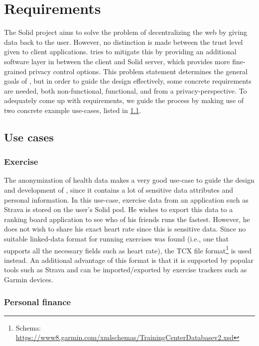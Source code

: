 \chapter{Requirements}
\label{cha:middleware}
The Solid project aims to solve the problem of decentralizing the web by giving data back to the user. However, no distinction is made between the trust level given to client applications. \middleware{} tries to mitigate this by providing an additional software layer in between the client and Solid server, which provides more fine-grained privacy control options. This problem statement determines the general goals of \middleware{}, but in order to guide the design effectively, some concrete requirements are needed, both non-functional, functional, and from a privacy-perspective. To adequately come up with requirements, we guide the process by making use of two concrete example use-cases, listed in \ref{sec:usecases}.   

\section{Use cases}
\label{sec:usecases}
\subsection{Exercise}
The anonymization of health data makes a very good use-case to guide the design and development of \middleware{}, since it contains a lot of sensitive data attributes and personal information. In this use-case, exercise data from an application such as Strava is stored on the user's Solid pod. He wishes to export this data to a ranking board application to see who of his friends runs the fastest. However, he does not wish to share his exact heart rate since this is sensitive data. Since no suitable linked-data format for running exercises was found (i.e., one that supports all the necessary fields such as heart rate), the \gls{TCX} file format\footnote{Schema: \url{https://www8.garmin.com/xmlschemas/TrainingCenterDatabasev2.xsd}} is used instead. An additional advantage of this format is that it is supported by popular tools such as Strava and can be imported/exported by exercise trackers such as Garmin devices.

\subsection{Personal finance}
